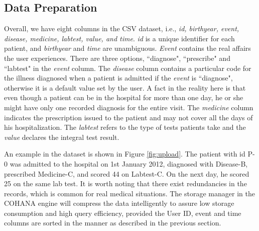 \documentclass[10pt,conference,letterpaper]{IEEEtran}
\begin{document}
\subsection{Data Preparation}

Overall, we have eight columns in the CSV dataset, i.e., \emph{id, birthyear, event, disease, medicine, labtest, value, and time}. \emph{id} is a unique identifier for each patient, and \emph{birthyear} and \emph{time} are unambiguous. 
\emph{Event} contains the real affairs the user experiences.
There are three options, ``diagnose", ``prescribe" and ``labtest" in the \emph{event} column.
The \emph{disease} column contains a particular code for the illness diagnosed when a patient is admitted if the \emph{event} is ``diagnose", otherwise it is a default value set by the user.
A fact in the reality here is that even though a patient can be in the hospital for more than one day, he or she might have only one recorded diagnosis for the entire visit. 
The \emph{medicine} column indicates the prescription issued to the patient and may not cover all the days of his hospitalization. 
The \emph{labtest} refers to the type of tests patients take and the \emph{value} declares the integral test result. 

An example in the dataset is shown in Figure \ref{fig:upload}. The patient with id P-0 was admitted to the hospital on 1st January 2012, diagnosed with Disease-B, prescribed Medicine-C, and scored 44 on Labtest-C. On the next day, he scored 25 on the same lab test. 
It is worth noting that there exist redundancies in the records, which is common for real medical situations. 
The storage manager in the COHANA engine will compress the data intelligently to assure low storage consumption and high query efficiency, provided the User ID, event and time columns are sorted in the manner as described in the previous section.

\end{document}
